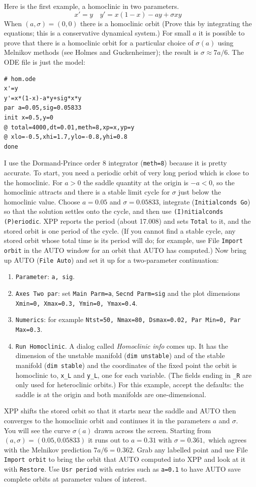 \documentclass{article}
\newcommand{\TCC}[1]{\medskip

\addcontentsline{toc}{subsubsection}{#1}
\noindent{\bf {#1}.}}
\begin{document}
\TCC{A homoclinic orbit}  Here is the first example, a homoclinic in two
parameters.
\[
x'=y \quad y'=x(1-x)-ay+\sigma xy
\]
When $(a,\sigma)=(0,0)$ there is a homoclinic orbit (Prove this by
integrating the equations; this is a conservative dynamical system.)
For small $a$ it is possible to prove that there is a homoclinic orbit
for a particular choice of $\sigma(a)$ using Melnikov methods (see
Holmes and Guckenheimer); the result is $\sigma\approx 7a/6.$
The ODE file is just the model:
\begin{verbatim}
# hom.ode
x'=y
y'=x*(1-x)-a*y+sig*x*y
par a=0.05,sig=0.05833
init x=0.5,y=0
@ total=4000,dt=0.01,meth=8,xp=x,yp=y
@ xlo=-0.5,xhi=1.7,ylo=-0.8,yhi=0.8
done
\end{verbatim}
I use the Dormand-Prince order 8 integrator (\verb|meth=8|) because it is pretty accurate.
To start, you need a periodic orbit of very long period which is close to the
homoclinic.  For $a>0$ the saddle quantity at the origin is $-a<0$, so the
homoclinic attracts and there is a stable limit cycle for $\sigma$ just
below the homoclinic value.  Choose $a=0.05$ and $\sigma=0.05833$, integrate
({\tt Initialconds Go}) so that the solution settles onto the cycle,
and then use {\tt (I)nitialconds (P)eriodic}.  XPP reports the period
(about 17.008) and sets {\tt Total} to it, and the stored orbit is one period of the
cycle.  (If you cannot find a stable cycle, any stored orbit whose total time is
its period will do; for example, use File {\tt Import orbit} in the AUTO window for an
orbit that AUTO has computed.)  Now bring up
AUTO ({\tt File Auto}) and set it up for a two-parameter continuation:
\begin{enumerate}
\item {\tt Parameter}: {\tt a, sig}.
\item {\tt Axes Two par}: set {\tt Main Parm=a}, {\tt Secnd Parm=sig} and the
plot dimensions {\tt Xmin=0, Xmax=0.3, Ymin=0, Ymax=0.4}.
\item {\tt Numerics}: for example {\tt Ntst=50, Nmax=80, Dsmax=0.02, Par Min=0, Par Max=0.3}.
\item {\tt Run Homoclinic}.  A dialog called {\em Homoclinic info} comes up.  It
has the dimension of the unstable manifold ({\tt dim unstable}) and
of the stable manifold ({\tt dim stable}) and the coordinates of the
fixed point the orbit is homoclinic to, {\tt x\_L} and {\tt y\_L}, one for
each variable.  (The fields ending in {\tt \_R} are only used for
heteroclinic orbits.)  For this example, accept the defaults: the saddle is at the origin and
both manifolds are one-dimensional.
\end{enumerate}
XPP shifts the stored orbit so that it starts near the saddle and
AUTO then converges to the homoclinic orbit and continues it in the
parameters $a$ and $\sigma.$  You will see the curve $\sigma(a)$ drawn
across the screen.  Starting from $(a,\sigma)=(0.05,0.05833)$ it
runs out to $a=0.31$ with $\sigma=0.361,$ which agrees with the Melnikov
prediction $7a/6=0.362.$  Grab any labelled point and use File {\tt Import orbit} to bring the orbit
that AUTO computed into XPP and look at it with {\tt Restore}.  Use
{\tt Usr period} with entries such as {\tt a=0.1} to have AUTO save complete
orbits at parameter values of interest.
\end{document}
